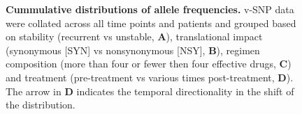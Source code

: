 \documentclass[12pt, oneside]{article}   	%
\begin{document}
\begin{figure}
\label{fig:supfig8}
\centering
{}
\caption{\textbf{Cummulative distributions of allele frequencies.} v-SNP data were collated across all time points and patients and grouped based on stability (recurrent vs unstable, \textbf{A}), translational impact (synonymous [SYN] vs nonsynonymous [NSY], \textbf{B}), regimen composition (more than four or fewer then four effective drugs, \textbf{C}) and treatment (pre-treatment vs various times post-treatment, \textbf{D}). The arrow in \textbf{D} indicates the temporal directionality in the shift of the distribution.}
\end{figure}
\end{document}
